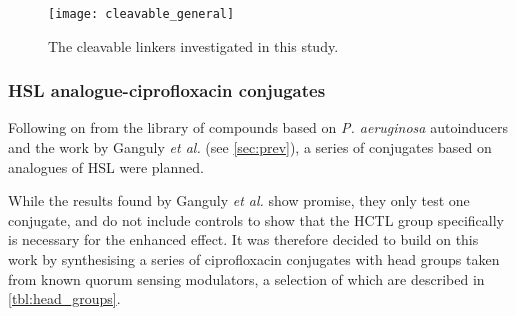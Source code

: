 \begin{figure}[H]
	\begin{center}
		\texttt{[image: cleavable\_general]}
		\caption{The cleavable linkers investigated in this study. \label{fgr:cleavable_general}}
	\end{center}
\end{figure}

\subsubsection{HSL analogue-ciprofloxacin conjugates\label{sec:AIA_intro}}

Following on from the library of compounds based on \textit{P. aeruginosa} autoinducers and the work by Ganguly \textit{et al.} (see \ref{sec:prev}), a series of conjugates based on analogues of HSL were planned. 

While the results found by Ganguly \textit{et al.} show promise, they only test one conjugate, and do not include controls to show that the HCTL group specifically is necessary for the enhanced effect.
It was therefore decided to build on this work by synthesising a series of ciprofloxacin conjugates with head groups taken from known quorum sensing modulators\cite{Galloway2011,Hodgkinson2012a}, a selection of which are described in \ref{tbl:head_groups}. 


